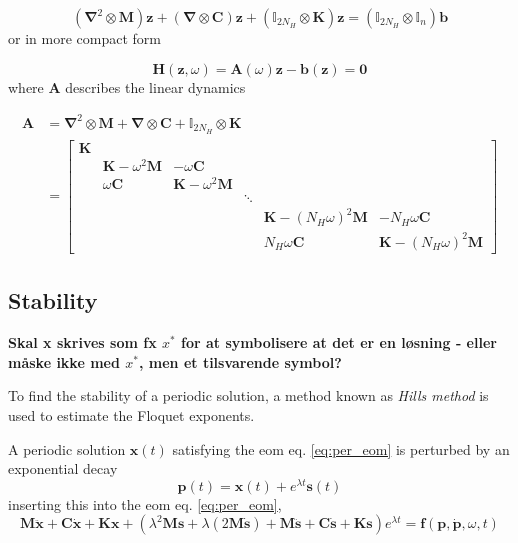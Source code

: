 \begin{equation}
  (\bm \nabla^2 \otimes \bm M)\bm z + (\bm \nabla \otimes \bm C)\bm z +
  (\mathbb{I}_{2N_H} \otimes \bm K)\bm z =
  (\mathbb{I}_{2N_H} \otimes \mathbb{I}_n )\bm b
\end{equation}
or in more compact form

\begin{equation}
  \label{eq:hb_feom_compact}
  \bm H(\bm z, \omega) = \bm A(\omega) \bm z - \bm b(\bm z) = \bm 0
\end{equation}
where $\bm A$ describes the linear dynamics

\begin{equation}
  \label{eq:hb_A}
  \begin{aligned}
    \bm A &= \bm \nabla^2 \otimes \bm M + \bm \nabla \otimes \bm C +
    \mathbb{I}_{2N_H} \otimes \bm K \\
    &=
    \begin{bmatrix}
      \bm K \\
      & \bm K - \omega^2 \bm M & -\omega \bm C \\
      & \omega \bm C & \bm K - \omega^2 \bm M \\
      & & & \ddots \\
      & & & & \bm K - (N_H \omega)^2 \bm M & -N_H \omega \bm C \\
      & & & & N_H \omega \bm C & \bm K - (N_H \omega)^2 \bm M
    \end{bmatrix}
  \end{aligned}
\end{equation}


\subsection{Stability}
\label{sec:hb_stab_appendix}

\textbf{Skal x skrives som fx $x^*$ for at symbolisere at det er en løsning -
  eller måske ikke med $x^*$, men et tilsvarende symbol?}

To find the stability of a periodic solution, a method known as \textit{Hills
  method} is used to estimate the Floquet exponents.

A periodic solution $\bm x(t)$ satisfying the eom eq. \eqref{eq:per_eom} is
perturbed by an exponential decay
\begin{equation}
  \label{eq:hb_pert}
  \bm p(t) = \bm x(t) + e^{\lambda t}\bm s(t)
\end{equation}
inserting this into the eom eq. \eqref{eq:per_eom},
\begin{equation}
  \bm M\ddot{\bm x} + \bm C\dot{\bm x} + \bm K\bm x +
  (\lambda^2 \bm M \bm s + \lambda(2\bm M \dot{\bm s}) +
  \bm M\ddot{\bm s} + \bm C\dot{\bm s} + \bm K \bm s ) e^{\lambda t} =
  \bm f(\bm p, \dot{\bm p}, \omega, t)
\end{equation}

